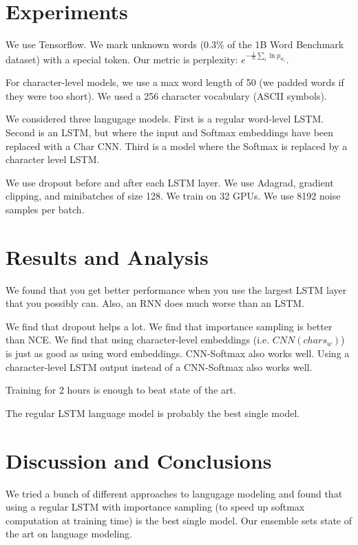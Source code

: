 \documentclass[a4paper]{article}
\begin{document}
\section{Experiments}
We use Tensorflow. We mark unknown words (0.3\% of the 1B Word Benchmark
dataset) with a special token. Our metric is perplexity: $e^{-\frac{1}{N}
\sum_{i}{\ln p_{w_i}}}$.

For character-level models, we use a max word length of 50 (we padded words if
they were too short). We used a 256 character vocabulary (ASCII symbols).

We considered three langugage models. First is a regular word-level LSTM.
Second is an LSTM, but where the input and Softmax embeddings have been
replaced with a Char CNN. Third is a model where the Softmax is replaced
by a character level LSTM.

We use dropout before and after each LSTM layer. We use Adagrad, gradient
clipping, and minibatches of size 128. We train on 32 GPUs. We use 8192
noise samples per batch.

\section{Results and Analysis}
We found that you get better performance when you use the largest LSTM layer
that you possibly can. Also, an RNN does much worse than an LSTM.

We find that dropout helps a lot. We find that importance sampling is better
than NCE. We find that using character-level embeddings (i.e. $CNN(chars_w)$)
is just as good as using word embeddings. CNN-Softmax also works well.
Using a character-level LSTM output instead of a CNN-Softmax also works well.

Training for 2 hours is enough to beat state of the art.

The regular LSTM language model is probably the best single model.

\section{Discussion and Conclusions}
We tried a bunch of different approaches to langugage modeling and found that
using a regular LSTM with importance sampling (to speed up softmax computation
at training time) is the best single model. Our ensemble sets state of
the art on language modeling.
\end{document}
